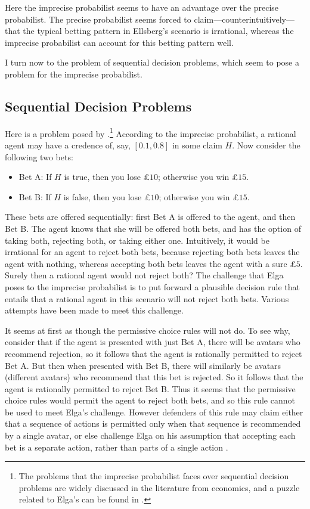 Here the imprecise probabilist seems to have an advantage over the precise probabilist. The precise probabilist seems forced to claim---counterintuitively---that the typical betting pattern in Ellsberg's scenario is irrational, whereas the imprecise probabilist can account for this betting pattern well. 

I turn now to the problem of sequential decision problems, which seem to pose a problem for the imprecise probabilist. 


\subsection{Sequential Decision Problems}

Here is a problem posed by \citet{elga2010}.\footnote{The problems that the imprecise probabilist faces over sequential decision problems are widely discussed in the literature from economics, and a puzzle related to Elga's can be found in \citet{hammond1988}.} According to the imprecise probabilist, a rational agent may have a credence of, say, $[0.1,0.8]$ in some claim $H$. Now consider the following two bets:
\begin{itemize}
\item[] Bet A: If $H$ is true, then you lose £$10$; otherwise you win £$15$.
\item[] Bet B: If $H$ is false, then you lose £$10$; otherwise you win £$15$.
\end{itemize}
These bets are offered sequentially: first Bet A is offered to the agent, and then Bet B. The agent knows that she will be offered both bets, and has the option of taking both, rejecting both, or taking either one. Intuitively, it would be irrational for an agent to reject both bets, because rejecting both bets leaves the agent with nothing, whereas accepting both bets leaves the agent with a sure £$5$. Surely then a rational agent would not reject both? The challenge that Elga poses to the imprecise probabilist is to put forward a plausible decision rule that entails that a rational agent in this scenario will not reject both bets. Various attempts have been made to meet this challenge.  

It seems at first as though the permissive choice rules will not do. To see why, consider that if the agent is presented with just Bet A, there will be avatars who recommend rejection, so it follows that the agent is rationally permitted to reject Bet A. But then when presented with Bet B, there will similarly be avatars (different avatars) who recommend that this bet is rejected. So it follows that the agent is rationally permitted to reject Bet B. Thus it seems that the permissive choice rules would permit the agent to reject both bets, and so this rule cannot be used to meet Elga's challenge. However defenders of this rule may claim either that a sequence of actions is permitted only when that sequence is recommended by a single avatar, or else challenge Elga on his assumption that accepting each bet is a separate action, rather than parts of a single action \citep{weatherson2003,williams2014}. 


